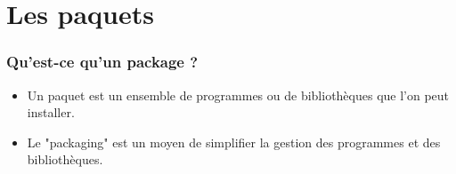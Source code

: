 \section{Les paquets}
\begin{frame}
    \frametitle{Qu'est-ce qu'un package ?}
    \begin{itemize}
        \item<1 ->  Un paquet est un ensemble de programmes ou de bibliothèques que l'on peut installer.
        \item<2 ->  Le "packaging" est un moyen de simplifier la gestion des programmes et des bibliothèques.
    \end{itemize}
\end{frame}
